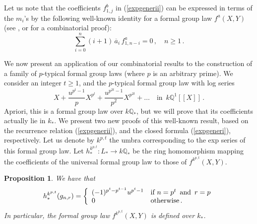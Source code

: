 \documentclass[a4paper,12pt]{amsart}
\newtheorem{prop}[equation]{Proposition}
\theoremstyle{definition}
\numberwithin{equation}{section}
\newcommand{\bQ}{{\mathbb Q}}
\newcommand{\case}[5]{#1#2 \left\{ \begin{array}{ll} #3 &\mbox{if $#4$} \\ #5 &\mbox{otherwise\,.} \end{array} \right.}
\newcommand{\spa}{\;\:}
\begin{document}
Let us note that the coefficients $f_{1,j}^b$ in (\ref{expgenerii}) can be expressed in terms of the $m_i$'s by the following well-known identity for a formal group law $f^a(X,Y)$ (see \cite{ravccs}, or \cite{larhas} for a combinatorial proof):
\begin{equation}\label{fglident}
\sum_{i=0}^n (i+1)\,\overline{a}_i\,f_{1,n-i}^a=0\,,\spa\spa n\ge 1\,.
\end{equation}  

We now present an application of our combinatorial results to the construction of a family of $p$-typical formal group laws (where $p$ is an arbitrary prime). We consider an integer $t\ge 1$, and the $p$-typical formal group law with log series
\[ X+\frac{u^{p^t-1}}{p} X^{p^t}+\frac{u^{p^{2t}-1}}{p^2} X^{p^{2t}}+\ldots\quad\mbox{in}\spa k\bQ^1[[X]]\,.\]
Apriori, this is a formal group law over $k\bQ_*$, but we will prove that its coefficients actually lie in $k_*$. We present two new proofs of this well-known result, based on the recurrence relation (\ref{expgenerii}), and the closed formula (\ref{expgeneri}), respectively. Let us denote by $k^{p,t}$ the umbra corresponding to the exp series of this formal group law. Let $h_*^{k^{p,t}}\colon L_*\rightarrow k\bQ_*$ be the ring homomorphism mapping the coefficients of the universal formal group law to those of $f^{k^{p,t}}(X,Y)$. 

\begin{prop}\label{integkpq}
We have that
\[\case{h_*^{k^{p,t}}(g_{n,r})}{=}{(-1)^{p^t-p^{t-1}}u^{p^{t}-1}}{n=p^{t}\spa\mbox{and}\spa r=p}{0}\]
In particular, the formal group law $f^{k^{p,t}}(X,Y)$ is defined over $k_*$.
\end{prop}
\end{document}

